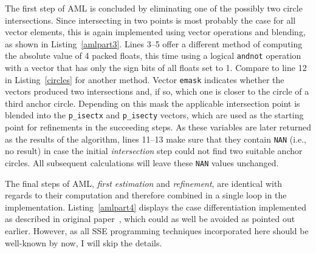 
The first step of AML is concluded by eliminating one of the possibly two circle intersections. Since intersecting in two points is most probably the case for all vector elements, this is again implemented using vector operations and blending, as shown in Listing~\ref{amlpart3}. Lines 3--5 offer a different method of computing the absolute value of 4 packed floats, this time using a logical \texttt{andnot} operation with a vector that has only the sign bits of all floats set to 1. Compare to line 12 in Listing~\ref{circles} for another method. Vector \texttt{emask} indicates whether the vectors produced two intersections and, if so, which one is closer to the circle of a third anchor circle. Depending on this mask the applicable intersection point is blended into the \texttt{p\_isectx} and \texttt{p\_isecty} vectors, which are used as the starting point for refinements in the succeeding steps. As these variables are later returned as the results of the algorithm, lines 11--13 make sure that they contain \texttt{NAN} (i.e., no result) in case the initial \emph{intersection} step could not find two suitable anchor circles. All subsequent calculations will leave these \texttt{NAN} values unchanged.


The final steps of AML, \emph{first estimation} and \emph{refinement}, are identical with regards to their computation and therefore combined in a single loop in the implementation. Listing~\ref{amlpart4} displays the case differentiation implemented as described in original paper~\cite[p. 264]{kuruoglu2009aml}, which could as well be avoided as pointed out earlier. However, as all SSE programming techniques incorporated here should be well-known by now, I will skip the details.


